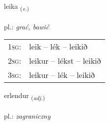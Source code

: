 \documentclass[frontgrid, backgrid]{flacards}\usepackage[]{graphicx}\usepackage[]{xcolor}
\begin{document}
\renewcommand{\flhead}{\vskip5pt \fboxsep=0pt {\small\bfseries\footnotesize Sagnorð | Verb}}
\renewcommand{\fcfoot}{\vskip5pt \fboxsep=0pt \hspace{2pt}{\small\bfseries\footnotesize 1K}}

\renewcommand{\blhead}{\vskip5pt {\small\bfseries\footnotesize Sagnorð | Verb }}
\renewcommand{\bcfoot}{\vskip5pt \hspace{2pt}{\small\bfseries\footnotesize 1K}}


{leika \small{\textsubscript{(\textit{v.})}} \\[1ex] %
\textphonetic{[leiːka]} \\
pl.: \emph{grać, bawić} \\  [2ex]
\renewcommand*{\arraystretch}{0.8}
\begin{tabular}{p{1cm}l}
\textsc{1sg}: & leik -- lék -- leikið \\ 
\textsc{2sg}: & leikur -- lékst -- leikið \\ 
\textsc{3sg}: & leikur -- lék -- leikið \\ 
\end{tabular}
}

\renewcommand{\flhead}{\vskip5pt \fboxsep=0pt {\small\bfseries\footnotesize Lýsingarorð | Adjective}}
\renewcommand{\fcfoot}{\vskip5pt \fboxsep=0pt \hspace{2pt}{\small\bfseries\footnotesize 1K}}

\renewcommand{\blhead}{\vskip5pt {\small\bfseries\footnotesize Lýsingarorð | Adjective }}
\renewcommand{\bcfoot}{\vskip5pt \hspace{2pt}{\small\bfseries\footnotesize 1K}}


{erlendur \small{\textsubscript{(\textit{adj.})}} \\[1ex] %
\textphonetic{[ɛrlɛntʏr]} \\
pl.: \emph{zagraniczny} \\  [2ex]
\renewcommand*{\arraystretch}{0.8}
}
\end{document}

